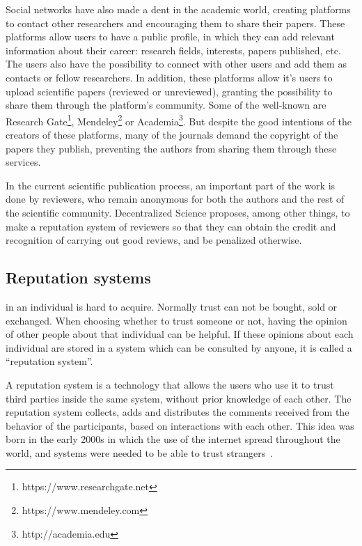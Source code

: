 Social networks have also made a dent in the academic world, creating platforms
to contact other researchers and encouraging them to share their papers. These
platforms allow users to have a public profile, in which they can add relevant
information about their career: research fields, interests, papers published,
etc. The users also have the possibility to connect with other users and add
them as contacts or fellow researchers. In addition, these platforms allow it's
users to upload scientific papers (reviewed or unreviewed), granting the
possibility to share them through the platform's community. Some of the
well-known are Research Gate\footnote{https://www.researchgate.net},
Mendeley\footnote{https://www.mendeley.com} or
Academia\footnote{http://academia.edu}. But despite the good intentions of the
creators of these platforms, many of the journals demand the copyright of the
papers they publish, preventing the authors from sharing them through these
services.

In the current scientific publication process, an important part of the work is
done by reviewers, who remain anonymous for both the authors and the rest of the
scientific community. Decentralized Science proposes, among other things, to
make a reputation system of reviewers so that they can obtain the credit and
recognition of carrying out good reviews, and be penalized otherwise.

\subsection{Reputation systems}
\label{scb:rs}

 in an individual is hard to acquire. Normally trust can not be
bought, sold or exchanged. When choosing whether to trust someone or not, having
the opinion of other people about that individual can be helpful. If these
opinions about each individual are stored in a system which can be consulted by
anyone, it is called a ``reputation system''.

A reputation system is a technology that allows the users who use it to trust
third parties inside the same system, without prior knowledge of each other. The
reputation system collects, adds and distributes the comments received from the
behavior of the participants, based on interactions with each other. This idea
was born in the early 2000s in which the use of the internet spread throughout
the world, and systems were needed to be able to trust
strangers~\cite{resnick2000reputation}.


